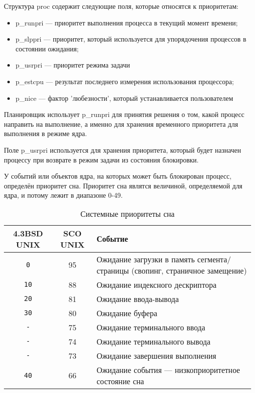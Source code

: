 Структура proc содержит следующие поля, которые относятся к приоритетам:
\begin{itemize}
	\item p\_runpri --- приоритет выполнения процесса в текущий момент времени;
	\item p\_slppri --- приоритет, который используется для упорядочения процессов в состоянии ожидания;
	\item p\_usrpri --- приоритет режима задачи
	\item p\_estcpu --- результат последнего измерения использования процессора;
	\item p\_nice --- фактор 'любезности', который устанавливается пользователем
\end{itemize}

Планировщик использует p\_runpri для принятия решения о том, какой процесс направить на выполнение, а именно для хранения временного приоритета для выполнения в режиме ядра.

Поле p\_usrpri используется для хранения приоритета, который будет назначен процессу при возврате в режим задачи из состояния блокировки. 

У событий или объектов ядра, на которых может быть блокирован процесс, определён приоритет сна. Приоритет сна являтся величиной, определяемой для ядра, и потому лежит в диапазоне 0-49.

\begin{table}[h]
	\caption{Системные приоритеты сна}
	\label{tab:bsd}
	\begin{center}
		\begin{tabular}{ |c|c|p{9cm}|  }
			\hline
			\textbf{4.3BSD UNIX} & \textbf{SCO UNIX} & \textbf{Событие} \\
			\hline
			\texttt{0} & 95 & Ожидание загрузки в память сегмента/страницы (свопинг, страничное замещение) \\
			\hline
			\texttt{10} & 88 & Ожидание индексного дескриптора \\
			\hline
			\texttt{20} & 81 & Ожидание ввода-вывода \\
			\hline
			\texttt{30} & 80 & Ожидание буфера \\
			\hline
			\texttt{-} & 75 & Ожидание терминального ввода \\
			\hline
			\texttt{-} & 74 & Ожидание терминального вывода \\
			\hline
			\texttt{-} & 73 & Ожидание завершения выполнения \\
			\hline
			\texttt{40} & 66 & Ожидание события --- низкоприоритетное состояние сна \\
			\hline
		\end{tabular}
	\end{center}
\end{table}

